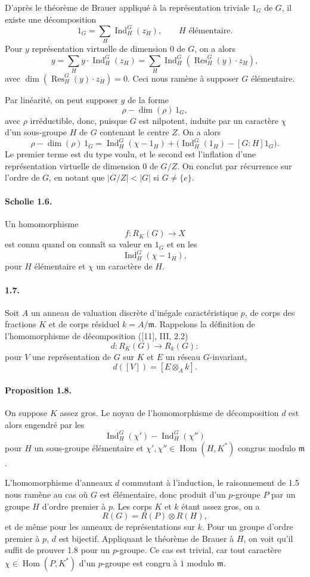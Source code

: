 \documentclass[10pt]{article}
\newcommand{\Hom}{\operatorname{Hom}}
\newcommand{\Ind}{\operatorname{Ind}}
\newcommand{\Res}{\operatorname{Res}}
\begin{document}
D'après le théorème de Brauer appliqué à la représentation triviale \(1_G\) de \(G\), il existe une décomposition
\[
1_G=\sum_H \Ind_H^G(z_H),
\qquad H\text{ élémentaire}.
\]
Pour \(y\) représentation virtuelle de dimension \(0\) de \(G\), on a alors
\[
y=\sum_H y\cdot \Ind_H^G(z_H)
  =\sum_H\Ind_H^G(\Res_H^G(y)\cdot z_H),
\]
avec \(\dim(\Res_H^G(y)\cdot z_H)=0\). Ceci nous ramène à supposer \(G\) élémentaire.

Par linéarité, on peut supposer \(y\) de la forme
\[
\rho-\dim(\rho)\,1_G,
\]
avec \(\rho\) irréductible, donc, puisque \(G\) est nilpotent, induite par un caractère \(\chi\) d'un sous-groupe \(H\) de \(G\) contenant le centre \(Z\). On a alors
\[
\rho-\dim(\rho)\,1_G
=
\Ind_H^G(\chi-1_H)+\bigl(\Ind_H^G(1_H)-[G:H]1_G\bigr).
\]
Le premier terme est du type voulu, et le second est l'inflation d'une représentation virtuelle de dimension \(0\) de \(G/Z\). On conclut par récurrence sur l'ordre de \(G\), en notant que \(|G/Z|<|G|\) si \(G\ne\{e\}\).

\paragraph{Scholie 1.6.} Un homomorphisme
\[
f:R_K(G)\longrightarrow X
\]
est connu quand on connaît sa valeur en \(1_G\) et en les
\[
\Ind_H^G(\chi-1_H),
\]
pour \(H\) élémentaire et \(\chi\) un caractère de \(H\).

\paragraph{1.7.} Soit \(A\) un anneau de valuation discrète d'inégale caractéristique \(p\), de corps des fractions \(K\) et de corps résiduel \(k=A/\mathfrak m\). Rappelons la définition de l'homomorphisme de décomposition ([11], III, 2.2)
\[
d:R_K(G)\longrightarrow R_k(G):
\]
pour \(V\) une représentation de \(G\) sur \(K\) et \(E\) un réseau \(G\)-invariant,
\[
d([V])=[E\otimes_Ak].
\]




\paragraph{Proposition 1.8.} On suppose \(K\) assez gros. Le noyau de l'homomorphisme de décomposition \(d\) est alors engendré par les
\[
\Ind_H^G(\chi')-\Ind_H^G(\chi'')
\]
pour \(H\) un sous-groupe élémentaire et \(\chi',\chi''\in\Hom(H,K^*)\) congrus modulo \(\mathfrak m\).

L'homomorphisme d'anneaux \(d\) commutant à l'induction, le raisonnement de 1.5 nous ramène au cas où \(G\) est élémentaire, donc produit d'un \(p\)-groupe \(P\) par un groupe \(H\) d'ordre premier à \(p\). Les corps \(K\) et \(k\) étant assez gros, on a
\[
R(G)=R(P)\otimes R(H),
\]
et de même pour les anneaux de représentations sur \(k\). Pour un groupe d'ordre premier à \(p\), \(d\) est bijectif. Appliquant le théorème de Brauer à \(H\), on voit qu'il suffit de prouver 1.8 pour un \(p\)-groupe. Ce cas est trivial, car tout caractère \(\chi\in\Hom(P,K^*)\) d'un \(p\)-groupe est congru à \(1\) modulo \(\mathfrak m\).
\end{document}
